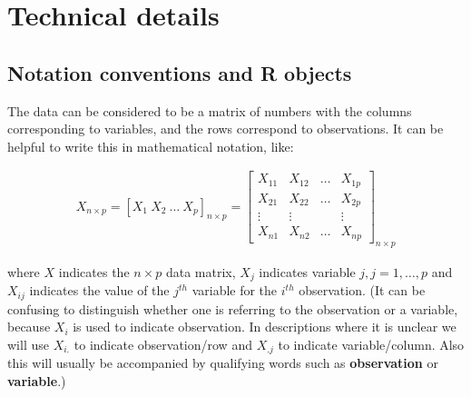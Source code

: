 \documentclass[
  letterpaper,
]{krantz}
\newenvironment{Shaded}{\begin{snugshade}}{\end{snugshade}}
\newcommand{\AttributeTok}[1]{\textcolor[rgb]{0.40,0.45,0.13}{#1}}
\newcommand{\ConstantTok}[1]{\textcolor[rgb]{0.56,0.35,0.01}{#1}}
\newcommand{\DecValTok}[1]{\textcolor[rgb]{0.68,0.00,0.00}{#1}}
\newcommand{\FunctionTok}[1]{\textcolor[rgb]{0.28,0.35,0.67}{#1}}
\newcommand{\NormalTok}[1]{\textcolor[rgb]{0.00,0.23,0.31}{#1}}
\newcommand{\SpecialCharTok}[1]{\textcolor[rgb]{0.37,0.37,0.37}{#1}}
\begin{document}
\begin{Shaded}
\end{Shaded}

\chapter{Technical details}\label{sec-notation}

\section{Notation conventions and R
objects}\label{notation-conventions-and-r-objects}

The data can be considered to be a matrix of numbers with the columns
corresponding to variables, and the rows correspond to observations. It
can be helpful to write this in mathematical notation, like:

\begin{eqnarray*}
X_{n\times p} =
[X_1~X_2~\dots~X_p]_{n\times p} = \left[ \begin{array}{cccc}
X_{11} & X_{12} & \dots & X_{1p} \\
X_{21} & X_{22} & \dots & X_{2p}\\
\vdots & \vdots &  & \vdots \\
X_{n1} & X_{n2} & \dots & X_{np} \end{array} \right]_{n\times p}
\end{eqnarray*}

where \(X\) indicates the \(n\times p\) data matrix, \(X_j\) indicates
variable \(j, j=1, \dots, p\) and \(X_{ij}\) indicates the value of the
\(j^{th}\) variable for the \(i^{th}\) observation. (It can be confusing
to distinguish whether one is referring to the observation or a
variable, because \(X_i\) is used to indicate observation. In
descriptions where it is unclear we will use \(X_{i.}\) to indicate
observation/row and \(X_{.j}\) to indicate variable/column. Also this
will usually be accompanied by qualifying words such as
\textbf{observation} or \textbf{variable}.)
\end{document}
